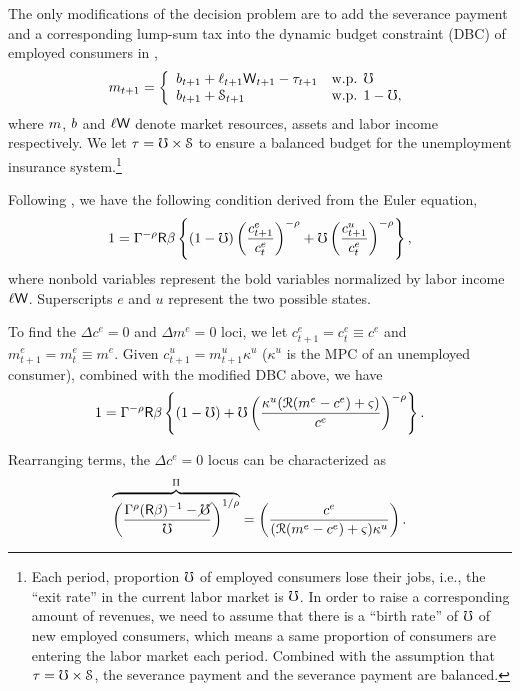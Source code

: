 The only modifications of the decision problem are to add
the severance payment and a corresponding lump-sum tax into the
dynamic budget constraint (DBC) of employed consumers in
\cite{ctDiscrete},
\begin{displaymath}
    m_{t+1}=\left\{
    \begin{array}{ll}
    b_{t+1}+\ell_{t+1}\mathsf{W}_{t+1}-\tau_{t+1} & \mbox{w.p. } \mho\\
    b_{t+1}+\mathcal{S}_{t+1} & \mbox{w.p. }1-\mho,
    \end{array}
    \right.
\end{displaymath}
where $m$, $b$ and $\ell\mathsf{W}$ denote market resources,
assets and labor income respectively. We let $\tau=\mho\times
\mathcal{S}$ to ensure a balanced budget for the unemployment
insurance system.\footnote{Each period, proportion
  $\mho$ of employed consumers lose their jobs, i.e., the ``exit
  rate'' in the current labor market is $\mho$.  In order to raise a
  corresponding amount of revenues, we need to assume that there is a
  ``birth rate'' of $\mho$ of new employed consumers, which means a
  same proportion of consumers are entering the labor market each
  period. Combined with the assumption that $\tau=\mho\times
  \mathcal{S}$, the severance payment and the severance payment are
  balanced.}

Following \cite{ctDiscrete}, we have the following condition derived from the Euler equation,
\begin{equation}
  1  = \Gamma^{-\rho}\mathsf{R}\beta \left\{(1-\mho)\left(\frac{c^{e}_{t+1}}{c^{e}_{t}}\right)^{-\rho}+\mho \left(\frac{c^{u}_{t+1}}{c^{e}_{t}}\right)^{-\rho}\right\},
\end{equation}
where nonbold variables represent the bold variables normalized by
labor income $\ell\mathsf{W}$. Superscripts $e$ and $u$ represent the two
possible states.

To find the $\Delta c^e=0$ and $\Delta m^e=0$ loci, we let
$c_{t+1}^e=c_t^e\equiv c^e$ and $m_{t+1}^e=m_{t}^e\equiv m^e$. Given
$c_{t+1}^u=m_{t+1}^u\kappa^u$ ($\kappa^u$ is the MPC of an unemployed
consumer), combined with the modified DBC above, we have
\begin{equation*}
1 = \Gamma^{-\rho}\mathsf{R}\beta \left\{(1-\mho)+\mho \left(\frac{\kappa^{u}(\mathcal{R}(m^e-c^e)+\varsigma)}{c^{e}}\right)^{-\rho}\right\}.
\end{equation*}

Rearranging terms, the $\Delta c^e=0$ locus can be characterized as
\begin{equation}
\overbrace{\left(\frac{\Gamma^{\rho}(\mathsf{R}\beta)^{-1}-\cancel{\mho}}{\mho}\right)^{1/\rho}}^{\Pi}=\left(\frac{c^e}{(\mathcal{R}(m^e-c^e)+\varsigma)\kappa^{u}}\right).
\end{equation}

